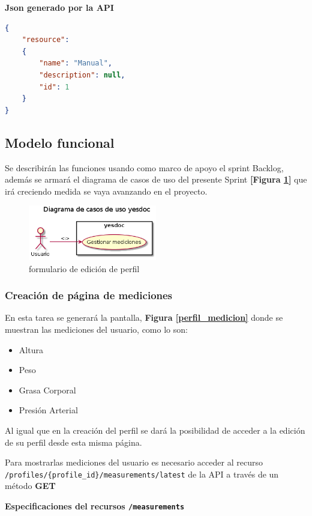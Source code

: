     \textbf{Json generado por la API} 
    \begin{lstlisting}[language=json,firstnumber=1]
{
    "resource": 
    {
        "name": "Manual",
        "description": null,
        "id": 1
    }
}
    \end{lstlisting}
    
\subsection{Modelo funcional} %
Se describirán las funciones usando como marco de apoyo el sprint Backlog, además se armará el diagrama de casos de uso del presente Sprint \textbf{[Figura \ref{2-caso_de_uso}]} que irá creciendo  medida se vaya avanzando en el proyecto.
    \begin{figure}[h]
        \centering
        \includegraphics[width=0.5\textwidth]{img/2-caso_de_uso}
        \caption{formulario de edición de perfil}
		\label{2-caso_de_uso}
    \end{figure}

    
\subsubsection{Creación de página de mediciones}
En esta tarea  se generará la pantalla, \textbf{Figura \ref{perfil_medicion}} donde se muestran las mediciones del usuario, como lo son:
      \begin{itemize}
	      \item Altura
          \item Peso
          \item Grasa Corporal
          \item Presión Arterial
      \end{itemize}
      Al igual que en la creación del perfil se dará la posibilidad de acceder a la edición de su perfil desde esta misma página.
      
Para mostrarlas mediciones del usuario es necesario acceder al recurso \texttt{/profiles/\{profile\_id\}/measurements/latest} de la API a través de un método \textbf{GET}


      \textbf{Especificaciones del recursos \texttt{/measurements}}


